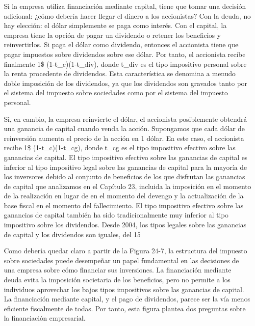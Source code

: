 \documentclass[10pt,a4paper]{article}
\begin{document}
Si la empresa utiliza financiación mediante capital, tiene que tomar una decisión adicional: ¿cómo debería hacer llegar el dinero a los accionistas? Con la deuda, no hay elección: el dólar simplemente se paga como interés. Con el capital, la empresa tiene la opción de pagar un dividendo o retener los beneficios y reinvertirlos. Si paga el dólar como dividendo, entonces el accionista tiene que pagar impuestos sobre dividendos sobre ese dólar. Por tanto, el accionista recibe finalmente 1\$ \times (1-t_c)\times(1-t_{div}), donde t_{div} es el tipo impositivo personal sobre la renta procedente de dividendos. Esta característica se denomina a menudo doble imposición de los dividendos, ya que los dividendos son gravados tanto por el sistema del impuesto sobre sociedades como por el sistema del impuesto personal.

Si, en cambio, la empresa reinvierte el dólar, el accionista posiblemente obtendrá una ganancia de capital cuando venda la acción. Supongamos que cada dólar de reinversión aumenta el precio de la acción en 1 dólar. En este caso, el accionista recibe 1\$ \times (1-t_c)\times(1-t_{cg}), donde t_{cg} es el tipo impositivo efectivo sobre las ganancias de capital. El tipo impositivo efectivo sobre las ganancias de capital es inferior al tipo impositivo legal sobre las ganancias de capital para la mayoría de los inversores debido al conjunto de beneficios de los que disfrutan las ganancias de capital que analizamos en el Capítulo 23, incluida la imposición en el momento de la realización en lugar de en el momento del devengo y la actualización de la base fiscal en el momento del fallecimiento. El tipo impositivo efectivo sobre las ganancias de capital también ha sido tradicionalmente muy inferior al tipo impositivo sobre los dividendos. Desde 2004, los tipos legales sobre las ganancias de capital y los dividendos son iguales, del 15 %

Como debería quedar claro a partir de la Figura 24-7, la estructura del impuesto sobre sociedades puede desempeñar un papel fundamental en las decisiones de una empresa sobre cómo financiar sus inversiones. La financiación mediante deuda evita la imposición societaria de los beneficios, pero no permite a los individuos aprovechar los bajos tipos impositivos sobre las ganancias de capital. La financiación mediante capital, y el pago de dividendos, parece ser la vía menos eficiente fiscalmente de todas. Por tanto, esta figura plantea dos preguntas sobre la financiación empresarial.
\end{document}
